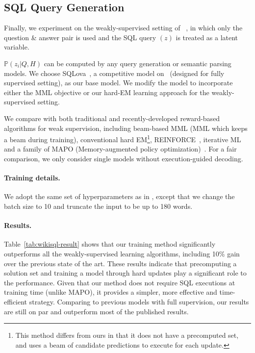 \documentclass[11pt,a4paper]{article}
\begin{document}
\subsection{SQL Query Generation}\label{subsec:semantic-parsing-result}

Finally, we experiment on the weakly-supervised setting of \wikisql~\citep{wikisql}, in which only the question \& answer pair is used and the SQL query $(z)$ is treated as a latent variable. 

$\mathbb{P}(z_i|Q, H)$ can be computed by any query generation or semantic parsing models. We choose SQLova~\citep{hwang2019comprehensive}, a competitive model on \wikisql~(designed for fully supervised setting), as our base model. We modify the model to incorporate either the MML objective or our hard-EM learning approach for the weakly-supervised setting.


We compare with both traditional and recently-developed reward-based algorithms for weak supervision, including beam-based MML (MML which keeps a beam during training), conventional hard EM\footnote{This method differs from ours in that it does not have a precomputed set, and uses a beam of candidate predictions to execute for each update.}, REINFORCE~\citep{reinforce}, iterative ML~\citep{imlfirst,imlsecond} and a family of MAPO (Memory-augmented policy optimization)~\citep{mapo,mapox}. For a fair comparison, we only consider single models without execution-guided decoding.


\paragraph{Training details.}
We adopt the same set of hyperparameters as in \citet{hwang2019comprehensive}, except that we change the batch size to 10 and truncate the input to be up to 180 words. 

\paragraph{Results.}
Table~\ref{tab:wikisql-result} shows that our training method significantly outperforms all the weakly-supervised learning algorithms, including 10\% gain over the previous state of the art.
These results indicate that precomputing a solution set and training a model through hard updates play a significant role to the performance.
Given that our method does not require SQL executions at training time (unlike MAPO), it provides a simpler, more effective and time-efficient strategy. Comparing to previous models with full supervision, our results are still on par and outperform most of the published results. 
\end{document}
